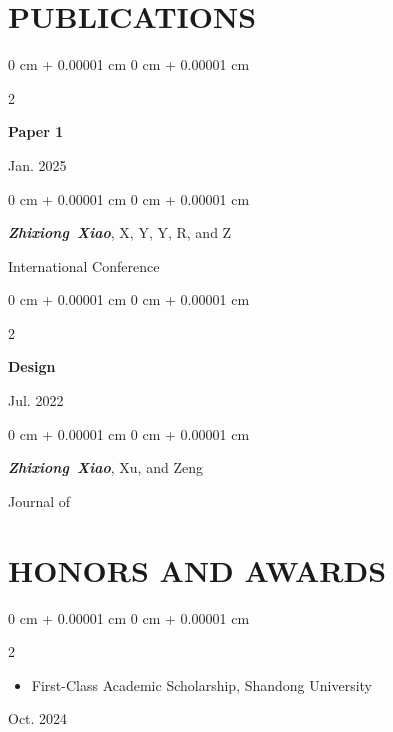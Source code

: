 \documentclass[10pt, letterpaper]{article}
\newenvironment{highlights}{
    \begin{itemize}[
        topsep=0.10 cm,
        parsep=0.10 cm,
        partopsep=0pt,
        itemsep=0pt,
        leftmargin=0 cm + 10pt
    ]
}{
    \end{itemize}
} %
\newenvironment{onecolentry}{
    \begin{adjustwidth}{
        0 cm + 0.00001 cm
    }{
        0 cm + 0.00001 cm
    }
}{
    \end{adjustwidth}
} %
\newenvironment{twocolentry}[2][]{
    \onecolentry
    \def\secondColumn{#2}
    \setcolumnwidth{\fill, 4.5 cm}
    \begin{paracol}{2}
}{
    \switchcolumn \raggedleft \secondColumn
    \end{paracol}
    \endonecolentry
} %
\begin{document}

\section{PUBLICATIONS}

\begin{samepage}
\begin{twocolentry}{Jan. 2025}

\textbf{Paper 1}
\end{twocolentry}

\vspace{0.10 cm}

\begin{onecolentry}
\mbox{\textbf{\textit{Zhixiong Xiao}}}, \mbox{X}, \mbox{Y}, \mbox{Y}, \mbox{R}, and \mbox{Z}

\vspace{0.05 cm}

International Conference
\end{onecolentry}

\vspace{0.2 cm}
\begin{twocolentry}{Jul. 2022}

\textbf{Design}
\end{twocolentry}

\vspace{0.10 cm}

\begin{onecolentry}

\mbox{\textbf{\textit{Zhixiong Xiao}}}, \mbox{Xu}, and \mbox{Zeng}

\vspace{0.05 cm}

Journal of 
\end{onecolentry}
\end{samepage}

\section{HONORS AND AWARDS}

\begin{twocolentry}{Oct. 2024}
\begin{highlights}
\item First-Class Academic Scholarship, Shandong University
\end{highlights}
\end{twocolentry}
\end{document}

